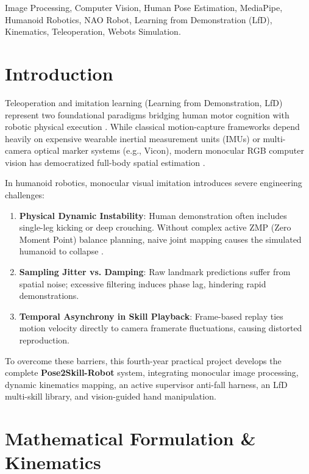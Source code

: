 \documentclass[conference,10pt,twocolumn]{IEEEtran}
\begin{document}
\begin{IEEEkeywords}
Image Processing, Computer Vision, Human Pose Estimation, MediaPipe, Humanoid Robotics, NAO Robot, Learning from Demonstration (LfD), Kinematics, Teleoperation, Webots Simulation.
\end{IEEEkeywords}

\section{Introduction}
Teleoperation and imitation learning (Learning from Demonstration, LfD) represent two foundational paradigms bridging human motor cognition with robotic physical execution \cite{argall2009survey, billard2008robot}. While classical motion-capture frameworks depend heavily on expensive wearable inertial measurement units (IMUs) or multi-camera optical marker systems (e.g., Vicon), modern monocular RGB computer vision has democratized full-body spatial estimation \cite{lugaresi2019mediapipe}.

In humanoid robotics, monocular visual imitation introduces severe engineering challenges:
\begin{enumerate}
    \item \textbf{Physical Dynamic Instability}: Human demonstration often includes single-leg kicking or deep crouching. Without complex active ZMP (Zero Moment Point) balance planning, naive joint mapping causes the simulated humanoid to collapse \cite{schaal1999imitation}.
    \item \textbf{Sampling Jitter vs. Damping}: Raw landmark predictions suffer from spatial noise; excessive filtering induces phase lag, hindering rapid demonstrations.
    \item \textbf{Temporal Asynchrony in Skill Playback}: Frame-based replay ties motion velocity directly to camera framerate fluctuations, causing distorted reproduction.
\end{enumerate}

To overcome these barriers, this fourth-year practical project develops the complete \textbf{Pose2Skill-Robot} system, integrating monocular image processing, dynamic kinematics mapping, an active supervisor anti-fall harness, an LfD multi-skill library, and vision-guided hand manipulation.

\section{Mathematical Formulation \& Kinematics}
\end{document}
